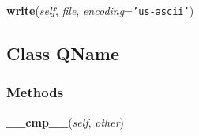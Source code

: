     \label{xml:etree:ElementTree:ElementTree:write}

    \vspace{0.5ex}

\hspace{.8\funcindent}\begin{boxedminipage}{\funcwidth}

    \raggedright \textbf{write}(\textit{self}, \textit{file}, \textit{encoding}={\tt \texttt{'}\texttt{us-ascii}\texttt{'}})

\setlength{\parskip}{2ex}
\setlength{\parskip}{1ex}
    \end{boxedminipage}



\subsection{Class QName}

    \label{xml:etree:ElementTree:QName}


  \subsubsection{Methods}

    \label{xml:etree:ElementTree:QName:__cmp__}

    \vspace{0.5ex}

\hspace{.8\funcindent}\begin{boxedminipage}{\funcwidth}

    \raggedright \textbf{\_\_cmp\_\_}(\textit{self}, \textit{other})

\setlength{\parskip}{2ex}
\setlength{\parskip}{1ex}
    \end{boxedminipage}


